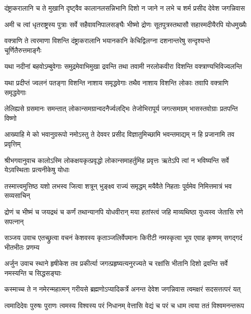 \fourlineindentedshloka
{दंष्ट्राकरालानि च ते मुखानि}
{दृष्ट्वैव कालानलसन्निभानि}
{दिशो न जाने न लभे च शर्म}
{प्रसीद देवेश जगन्निवास}%

\fourlineindentedshloka
{अमी च त्वां धृतराष्ट्रस्य पुत्राः}
{सर्वे सहैवावनिपालसङ्घैः}
{भीष्मो द्रोणः सूतपुत्रस्तथासौ}
{सहास्मदीयैरपि योधमुख्यैः}%

\fourlineindentedshloka
{वक्त्राणि ते त्वरमाणा विशन्ति}
{दंष्ट्राकरालानि भयानकानि}
{केचिद्विलग्ना दशनान्तरेषु}
{सन्दृश्यन्ते चूर्णितैरुत्तमाङ्गैः}%

\fourlineindentedshloka
{यथा नदीनां बहवोऽम्बुवेगाः}
{समुद्रमेवाभिमुखा द्रवन्ति}
{तथा तवामी नरलोकवीरा}
{विशन्ति वक्त्राण्यभिविज्वलन्ति}%

\fourlineindentedshloka
{यथा प्रदीप्तं ज्वलनं पतङ्गा}
{विशन्ति नाशाय समृद्धवेगाः}
{तथैव नाशाय विशन्ति लोकाः}
{तवापि वक्त्राणि समृद्धवेगाः}%

\fourlineindentedshloka
{लेलिह्यसे ग्रसमानः समन्तात्}
{लोकान्समग्रान्वदनैर्ज्वलद्भिः}
{तेजोभिरापूर्य जगत्समग्रम्}
{भासस्तवोग्राः प्रतपन्ति विष्णो}%

\fourlineindentedshloka
{आख्याहि मे को भवानुग्ररूपो}
{नमोऽस्तु ते देववर प्रसीद}
{विज्ञातुमिच्छामि भवन्तमाद्यम्}
{न हि प्रजानामि तव प्रवृत्तिम्}%

\fourlineindentedshloka
{श्रीभगवानुवाच}
{कालोऽस्मि लोकक्षयकृत्प्रवृद्धो}
{लोकान्समाहर्तुमिह प्रवृत्तः}
{ऋतेऽपि त्वां न भविष्यन्ति सर्वे}
{येऽवस्थिताः प्रत्यनीकेषु योधाः}%

\fourlineindentedshloka
{तस्मात्त्वमुत्तिष्ठ यशो लभस्व}
{जित्वा शत्रून् भुङ्क्ष्व राज्यं समृद्धम्}
{मयैवैते निहताः पूर्वमेव}
{निमित्तमात्रं भव सव्यसाचिन्}%

\fourlineindentedshloka
{द्रोणं च भीष्मं च जयद्रथं च}
{कर्णं तथान्यानपि योधवीरान्}
{मया हतांस्त्वं जहि माव्यथिष्ठा}
{युध्यस्व जेतासि रणे सपत्नान्}%

{सञ्जय उवाच}
\fourlineindentedshloka
{एतच्छ्रुत्वा वचनं केशवस्य}
{कृताञ्जलिर्वेपमानः किरीटी}
{नमस्कृत्वा भूय एवाह कृष्णम्}
{सगद्गदं भीतभीतः प्रणम्य}%

{अर्जुन उवाच}
\fourlineindentedshloka
{स्थाने हृषीकेश तव प्रकीर्त्या}
{जगत्प्रहृष्यत्यनुरज्यते च}
{रक्षांसि भीतानि दिशो द्रवन्ति}
{सर्वे नमस्यन्ति च सिद्धसङ्घाः}%

\fourlineindentedshloka
{कस्माच्च ते न नमेरन्महात्मन्}
{गरीयसे ब्रह्मणोऽप्यादिकर्त्रे}
{अनन्त देवेश जगन्निवास}
{त्वमक्षरं सदसत्तत्परं यत्}%

\fourlineindentedshloka
{त्वमादिदेवः पुरुषः पुराणः}
{त्वमस्य विश्वस्य परं निधानम्}
{वेत्तासि वेद्यं च परं च धाम}
{त्वया ततं विश्वमनन्तरूप}%

